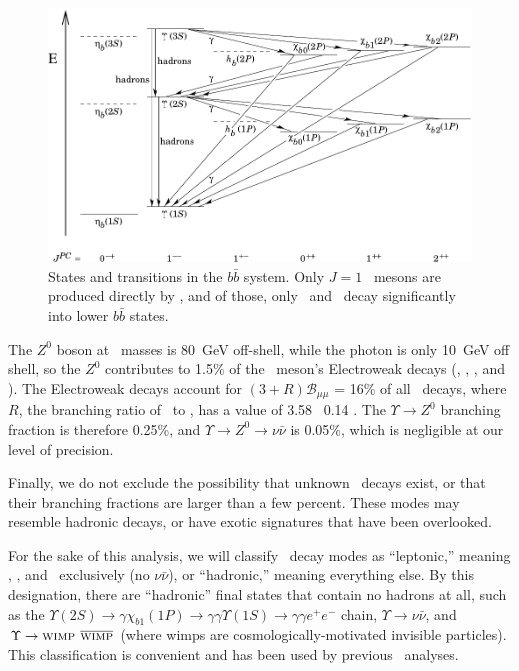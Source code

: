 \documentclass{cornell}
\begin{document}
\begin{figure}
  \begin{center}
    \includegraphics[width=0.9\linewidth]{plots/bbtransitions}
  \end{center}
  \caption[States and transitions in the $b\bar{b}$
  system]{\label{bbtransitions} States and transitions in the
  $b\bar{b}$ system.  Only $J=1$ \ups\ mesons are produced directly by
  \ee, and of those, only \uss\ and \usss\ decay significantly into
  lower $b\bar{b}$ states.}
\end{figure}

The $Z^0$ boson at \ups\ masses is 80~GeV off-shell, while the photon
is only 10~GeV off shell, so the $Z^0$ contributes to 1.5\% of the
\ups\ meson's Electroweak decays (\ee, \mumu, \tautau, and \qqbar).
The Electroweak decays account for $(3+R){\mathcal B}_{\mu\mu}$ = 16\%
of all \ups\ decays, where $R$, the branching ratio of \qqbar\ to
\mumu, has a value of 3.58 \PM\ 0.14 \cite{novor}.  The $\Upsilon \to
Z^0$ branching fraction is therefore 0.25\%, and $\Upsilon \to Z^0 \to
\nu\bar{\nu}$ is 0.05\%, which is negligible at our level of
precision.

Finally, we do not exclude the possibility that unknown \ups\ decays
exist, or that their branching fractions are larger than a few
percent.  These modes may resemble hadronic decays, or have exotic
signatures that have been overlooked.

For the sake of this analysis, we will classify \ups\ decay modes as
``leptonic,'' meaning \ee, \mumu, and \tautau\ exclusively (no
$\nu\bar{\nu}$), or ``hadronic,'' meaning everything else.  By this
designation, there are ``hadronic'' final states that contain no
hadrons at all, such as the $\Upsilon(2S) \to \gamma \chi_{b1}(1P) \to
\gamma\gamma \Upsilon(1S) \to \gamma\gamma e^+e^-$ chain, $\Upsilon
\to \nu\bar{\nu}$, and $\Upsilon \to \mbox{\sc wimp }
\overline{\mbox{\sc wimp}}$ (where {\sc wimp}s are
cosmologically-motivated invisible particles).  This classification is
convenient and has been used by previous \gee\ analyses.
\end{document}
